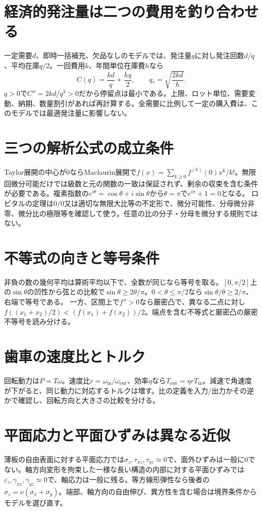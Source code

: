 \section{経済的発注量は二つの費用を釣り合わせる}
\label{theory:design:eoq}
一定需要\(d\)、即時一括補充、欠品なしのモデルでは、発注量\(q\)に対し発注回数\(d/q\)、平均在庫\(q/2\)。一回費用\(k\)、年間単位在庫費\(h\)なら
\begin{equation}C(q)=\frac{kd}{q}+\frac{hq}{2},\qquad q_*=\sqrt{\frac{2kd}{h}}.\end{equation}
\(q>0\)で\(C''=2kd/q^3>0\)だから停留点は最小である\autocite{finish56_eoq}。上限、ロット単位、需要変動、納期、数量割引があれば再計算する。全需要に比例して一定の購入費は、このモデルでは最適発注量に影響しない。

\section{三つの解析公式の成立条件}
\label{theory:design:mathformulas}
Taylor展開の中心が0ならMaclaurin展開で\(f(x)=\sum_{k\ge0}f^{(k)}(0)x^k/k!\)。無限回微分可能だけでは級数と元の関数の一致は保証されず、剰余の収束を含む条件が必要である。複素指数の\(e^{i\theta}=\cos\theta+i\sin\theta\)から\(\theta=\pi\)で\(e^{i\pi}+1=0\)となる。
ロピタルの定理は\(0/0\)又は適切な無限大比等の不定形で、微分可能性、分母微分非零、微分比の極限等を確認して使う。任意の比の分子・分母を微分する規則ではない。

\section{不等式の向きと等号条件}
\label{theory:design:inequality}
非負の数の幾何平均は算術平均以下で、全数が同じなら等号を取る。\([0,\pi/2]\)上の\(\sin\theta\)の凹性から弦との比較で\(\sin\theta\ge2\theta/\pi\)。\(0<\theta\le\pi/2\)なら\(\sin\theta/\theta\ge2/\pi\)、右端で等号である。
一方、区間上で\(f''>0\)なら厳密凸で、異なる二点に対し\(f((x_1+x_2)/2)<(f(x_1)+f(x_2))/2\)。端点を含む不等式と厳密凸の厳密不等号を読み分ける。

\section{歯車の速度比とトルク}
\label{theory:design:gear}
回転動力は\(P=T\omega\)。速度比\(r=\omega_{\mathrm{in}}/\omega_{\mathrm{out}}\)、効率\(\eta\)なら\(T_{\mathrm{out}}=\eta rT_{\mathrm{in}}\)。減速で角速度が下がると、同じ動力に対応するトルクは増す。比の定義を入力/出力かその逆かで確認し、回転方向と大きさの比較を分ける。

\section{平面応力と平面ひずみは異なる近似}
\label{theory:design:plane}
薄板の自由表面に対する平面応力では\(\sigma_z,\tau_{xz},\tau_{yz}\simeq0\)で、面外ひずみは一般に0でない。軸方向変形を拘束した一様な長い構造の内部に対する平面ひずみでは\(\varepsilon_z,\gamma_{xz},\gamma_{yz}\simeq0\)で、軸応力は一般に残る。等方線形弾性なら後者の\(\sigma_z=\nu(\sigma_x+\sigma_y)\)。端部、軸方向の自由伸び、異方性を含む場合は境界条件からモデルを選び直す。
